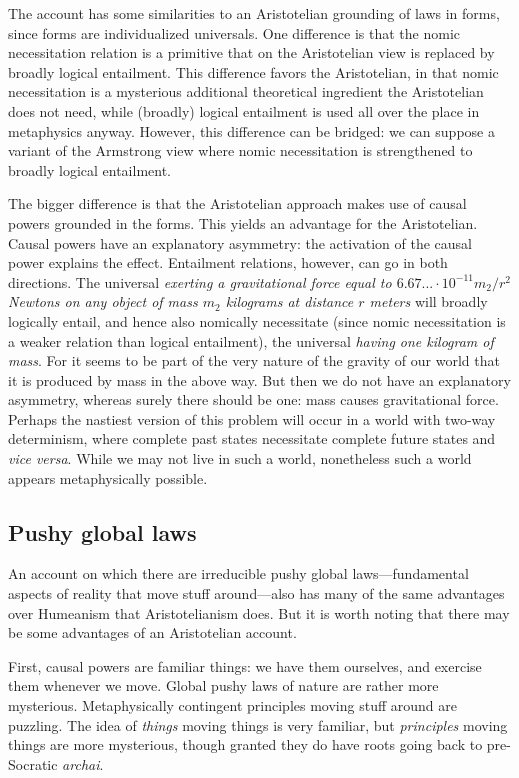 The account has some similarities to an Aristotelian grounding of laws in 
forms, since forms are individualized universals. One difference is that the nomic necessitation relation
is a primitive that on the Aristotelian view is replaced by broadly logical entailment. This difference
favors the Aristotelian, in that nomic necessitation is a mysterious additional theoretical ingredient the
Aristotelian does not need, while (broadly) logical entailment is used all over the place in metaphysics
anyway. However, this
difference can be bridged: we can suppose a variant of the Armstrong view where nomic necessitation
is strengthened to broadly logical
entailment.

The bigger difference is that the Aristotelian
approach makes use of causal powers grounded in the forms. This yields an advantage for the Aristotelian.
Causal powers have an explanatory asymmetry: the activation of the causal power explains the effect. 
Entailment relations, however, can go in both directions. The universal \textit{exerting a gravitational
force equal to $6.67... \cdot 10^{-11} m_2/r^2$ Newtons on any object of mass $m_2$ kilograms at 
distance $r$ meters} will broadly logically entail, and hence also nomically necessitate (since nomic
necessitation is a weaker relation than logical entailment), the universal \textit{having one kilogram of mass}.
For it seems to be part of the very nature of the gravity of our world that it is produced by mass in the
above way. But then we do not have an explanatory asymmetry, whereas surely there should be one: mass causes
gravitational force. Perhaps the nastiest version of this problem will occur in a world with two-way determinism, where 
complete past states necessitate complete future states and \textit{vice versa}. While we may not live in such 
a world, nonetheless such a world appears metaphysically possible.

\subsection{Pushy global laws}
An account on which there are irreducible pushy global laws---fundamental aspects of reality that move stuff
around---also has many of the same advantages over Humeanism that Aristotelianism
does. But it is worth noting that there may be some advantages of an Aristotelian account.

First, causal powers are familiar things: we have them ourselves, and exercise them whenever we move. Global pushy laws of nature are rather more mysterious. 
Metaphysically contingent principles moving stuff around are puzzling. The idea of
\textit{things} moving things is very familiar, but \textit{principles} moving things are more mysterious, though granted
they do have roots going back to pre-Socratic \textit{archai}.

